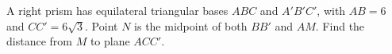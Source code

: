 A right prism has equilateral triangular bases $ ABC $ and $ A\prime B\prime C\prime $, with $ AB=6 $ and $ CC\prime=6\sqrt3 $. Point $ N $ is the midpoint of both $ BB\prime $ and $ AM $. Find the distance from $ M $ to plane $ ACC\prime $.
